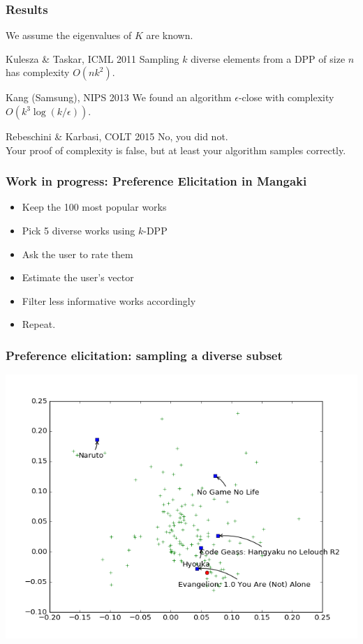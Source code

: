 \documentclass[handout]{beamer}
\begin{document}
\begin{frame}
  \frametitle{Results}
  We assume the eigenvalues of $K$ are known.
  \begin{block}{Kulesza \& Taskar, ICML 2011}
  Sampling $k$ diverse elements from a DPP of size $n$ has complexity $O(nk^2)$.
  \end{block}
  \pause
  \begin{block}{Kang (Samsung), NIPS 2013}
  We found an algorithm $\epsilon$-close with complexity $O(k^3 \log (k / \epsilon))$.
  \end{block}
  \pause
  \begin{block}{Rebeschini \& Karbasi, COLT 2015}
  No, you did not.\\\pause
  Your proof of complexity is false, but at least your algorithm samples correctly.
  \end{block}
\end{frame}

\begin{frame}
  \frametitle{Work in progress: Preference Elicitation in Mangaki}
  \begin{itemize}
  \item Keep the 100 most popular works
  \item Pick 5 diverse works using $k$-DPP
  \item Ask the user to rate them
  \item Estimate the user's vector
  \item Filter less informative works accordingly
  \item Repeat.
  \end{itemize}
\end{frame}

\begin{frame}
  \frametitle{Preference elicitation: sampling a diverse subset}
  \includegraphics[width=\linewidth]{figures/1.png}
\end{frame}
\end{document}
